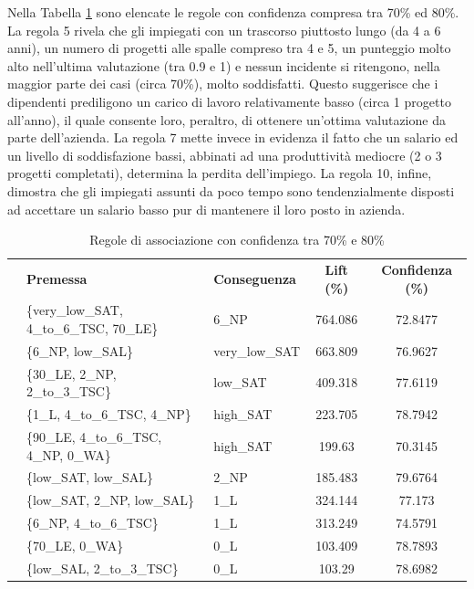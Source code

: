 \documentclass[a4paper]{article}
\newcounter{rowno}
\begin{document}
Nella Tabella \ref{tab:rules_conf_70_80} sono elencate le regole con confidenza compresa tra 70\% ed 80\%. La regola 5 rivela che gli impiegati con un trascorso piuttosto lungo (da 4 a 6 anni), un numero di progetti alle spalle compreso tra 4 e 5, un punteggio molto alto nell'ultima valutazione (tra 0.9 e 1) e nessun incidente si ritengono, nella maggior parte dei casi (circa 70\%), molto soddisfatti. Questo suggerisce che i dipendenti prediligono un carico di lavoro relativamente basso (circa 1 progetto all'anno), il quale consente loro, peraltro, di ottenere un'ottima valutazione da parte dell'azienda. La regola 7 mette invece in evidenza il fatto che un salario ed un livello di soddisfazione bassi, abbinati ad una produttività mediocre (2 o 3 progetti completati), determina la perdita dell'impiego. La regola 10, infine, dimostra che gli impiegati assunti da poco tempo sono tendenzialmente disposti ad accettare un salario basso pur di mantenere il loro posto in azienda.

\begin{table}[h]
\centering
\begingroup
\setlength{\tabcolsep}{5pt} %
\renewcommand{\arraystretch}{1} %
\setcounter{rowno}{0}

\begin{tabularx}{\textwidth}{|>{\stepcounter{rowno}\therowno}c|X|l|c|c|}
\hline
\multicolumn{1}{r}{\#} & {\textbf{Premessa}} & {\textbf{Conseguenza}} & {\textbf{Lift (\%)}} & {\textbf{Confidenza (\%)}} \\

& \{very\_low\_SAT, 4\_to\_6\_TSC, 70\_LE\} & 6\_NP & 764.086 & 72.8477 \\ 
& \{6\_NP, low\_SAL\} & very\_low\_SAT & 663.809 & 76.9627 \\ 
& \{30\_LE, 2\_NP, 2\_to\_3\_TSC\} & low\_SAT & 409.318 & 77.6119 \\ 
& \{1\_L, 4\_to\_6\_TSC, 4\_NP\} & high\_SAT & 223.705 & 78.7942 \\ 
& \{90\_LE, 4\_to\_6\_TSC, 4\_NP, 0\_WA\} & high\_SAT & 199.63 & 70.3145 \\ 
& \{low\_SAT, low\_SAL\} & 2\_NP & 185.483 & 79.6764 \\ 
& \{low\_SAT, 2\_NP, low\_SAL\} & 1\_L & 324.144 & 77.173 \\ 
& \{6\_NP, 4\_to\_6\_TSC\} & 1\_L & 313.249 & 74.5791 \\ 
& \{70\_LE, 0\_WA\} & 0\_L & 103.409 & 78.7893 \\ 
& \{low\_SAL, 2\_to\_3\_TSC\} & 0\_L & 103.29 & 78.6982 \\ 
\hline
\end{tabularx}
\endgroup
\caption{Regole di associazione con confidenza tra 70\% e 80\%}
\label{tab:rules_conf_70_80}
\end{table}
\end{document}
